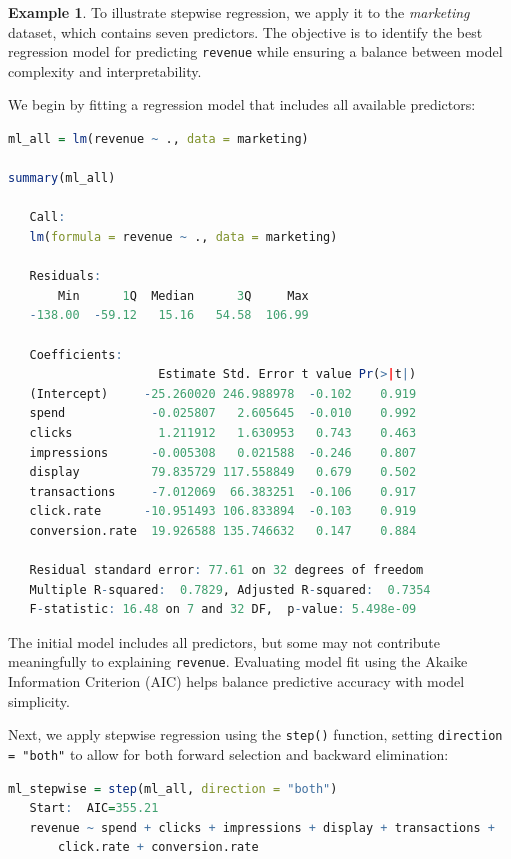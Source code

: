 \documentclass[
]{book}
\newcommand{\passthrough}[1]{#1}
\theoremstyle{definition}
\theoremstyle{definition}
\newtheorem{example}{Example}[chapter]
\theoremstyle{definition}
\theoremstyle{definition}
\theoremstyle{remark}
\begin{document}
\begin{example}
\protect\hypertarget{exm:ex-stepwise-regression}{}\label{exm:ex-stepwise-regression}To illustrate stepwise regression, we apply it to the \emph{marketing} dataset, which contains seven predictors. The objective is to identify the best regression model for predicting \passthrough{\lstinline!revenue!} while ensuring a balance between model complexity and interpretability.

We begin by fitting a regression model that includes all available predictors:

\begin{lstlisting}[language=R]
ml_all = lm(revenue ~ ., data = marketing)

summary(ml_all)
   
   Call:
   lm(formula = revenue ~ ., data = marketing)
   
   Residuals:
       Min      1Q  Median      3Q     Max 
   -138.00  -59.12   15.16   54.58  106.99 
   
   Coefficients:
                     Estimate Std. Error t value Pr(>|t|)
   (Intercept)     -25.260020 246.988978  -0.102    0.919
   spend            -0.025807   2.605645  -0.010    0.992
   clicks            1.211912   1.630953   0.743    0.463
   impressions      -0.005308   0.021588  -0.246    0.807
   display          79.835729 117.558849   0.679    0.502
   transactions     -7.012069  66.383251  -0.106    0.917
   click.rate      -10.951493 106.833894  -0.103    0.919
   conversion.rate  19.926588 135.746632   0.147    0.884
   
   Residual standard error: 77.61 on 32 degrees of freedom
   Multiple R-squared:  0.7829, Adjusted R-squared:  0.7354 
   F-statistic: 16.48 on 7 and 32 DF,  p-value: 5.498e-09
\end{lstlisting}

The initial model includes all predictors, but some may not contribute meaningfully to explaining \passthrough{\lstinline!revenue!}. Evaluating model fit using the Akaike Information Criterion (AIC) helps balance predictive accuracy with model simplicity.

Next, we apply stepwise regression using the \passthrough{\lstinline!step()!} function, setting \passthrough{\lstinline!direction = "both"!} to allow for both forward selection and backward elimination:

\begin{lstlisting}[language=R]
ml_stepwise = step(ml_all, direction = "both")
   Start:  AIC=355.21
   revenue ~ spend + clicks + impressions + display + transactions + 
       click.rate + conversion.rate
   

\end{lstlisting}
\end{example}
\end{document}
